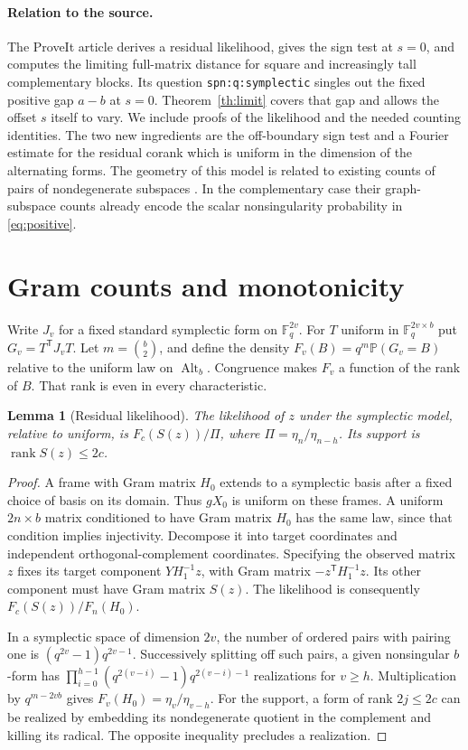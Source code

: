 \documentclass[11pt]{article}
\newtheorem{lemma}[theorem]{Lemma}
\newcommand{\F}{\mathbb F_q}
\newcommand{\Alt}{\operatorname{Alt}}
\newcommand{\rk}{\operatorname{rank}}
\newcommand{\Prob}{\mathbb P}
\newcommand{\T}{\mathsf T}
\begin{document}
\paragraph{Relation to the source.}
The ProveIt article \cite{proveit} derives a residual likelihood, gives the sign test at $s=0$, and computes the limiting full-matrix distance for square and increasingly tall complementary blocks. Its question \texttt{spn:q:symplectic} singles out the fixed positive gap $a-b$ at $s=0$. Theorem~\ref{th:limit} covers that gap and allows the offset $s$ itself to vary. We include proofs of the likelihood and the needed counting identities. The two new ingredients are the off-boundary sign test and a Fourier estimate for the residual corank which is uniform in the dimension of the alternating forms. The geometry of this model is related to existing counts of pairs of nondegenerate subspaces \cite{anzahl}. In the complementary case their graph-subspace counts already encode the scalar nonsingularity probability in \eqref{eq:positive}.

\section{Gram counts and monotonicity}

Write $J_v$ for a fixed standard symplectic form on $\F^{2v}$. For $T$ uniform in $\F^{2v\times b}$ put $G_v=T^\T J_vT$. Let $m=\binom b2$, and define the density $F_v(B)=q^m\Prob(G_v=B)$ relative to the uniform law on $\Alt_b$. Congruence makes $F_v$ a function of the rank of $B$. That rank is even in every characteristic.

\begin{lemma}[Residual likelihood]\label{lem:like}
The likelihood of $z$ under the symplectic model, relative to uniform, is $F_c(S(z))/\Pi$, where $\Pi=\eta_n/\eta_{n-h}$. Its support is $\rk S(z)\le2c$.
\end{lemma}
\begin{proof}
A frame with Gram matrix $H_0$ extends to a symplectic basis after a fixed choice of basis on its domain. Thus $gX_0$ is uniform on these frames. A uniform $2n\times b$ matrix conditioned to have Gram matrix $H_0$ has the same law, since that condition implies injectivity. Decompose it into target coordinates and independent orthogonal-complement coordinates. Specifying the observed matrix $z$ fixes its target component $YH_1^{-1}z$, with Gram matrix $-z^\T H_1^{-1}z$. Its other component must have Gram matrix $S(z)$. The likelihood is consequently $F_c(S(z))/F_n(H_0)$.

In a symplectic space of dimension $2v$, the number of ordered pairs with pairing one is $(q^{2v}-1)q^{2v-1}$. Successively splitting off such pairs, a given nonsingular $b$-form has $\prod_{i=0}^{h-1}(q^{2(v-i)}-1)q^{2(v-i)-1}$ realizations for $v\ge h$. Multiplication by $q^{m-2vb}$ gives $F_v(H_0)=\eta_v/\eta_{v-h}$. For the support, a form of rank $2j\le2c$ can be realized by embedding its nondegenerate quotient in the complement and killing its radical. The opposite inequality precludes a realization.
\end{proof}
\end{document}
